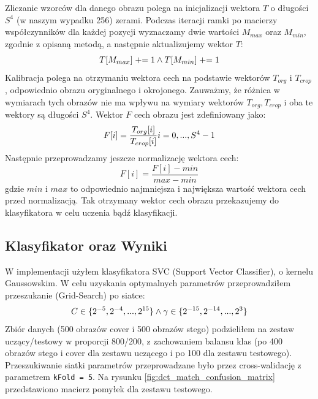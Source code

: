 Zliczanie wzorców dla danego obrazu polega na inicjalizacji wektora $T$ o długości $S^4$ (w naszym wypadku 256) zerami. Podczas iteracji ramki po macierzy współczynników dla każdej pozycji wyznaczamy dwie wartości $M_{max}$ oraz $M_{min}$, zgodnie z opisaną metodą, a następnie aktualizujemy wektor $T$:
\begin{equation}
	T[M_{max}] \mathrel{+}= 1 \space \land \space
	T[M_{min}] \mathrel{+}= 1
\end{equation}
Kalibracja polega na otrzymaniu wektora cech na podstawie wektorów $T_{org}$ i $T_{crop}$, odpowiednio obrazu oryginalnego i okrojonego. Zauważmy, że różnica w wymiarach tych obrazów nie ma wpływu na wymiary wektorów $T_{org}, T_{crop}$ i oba te wektory są długości $S^4$. Wektor $F$ cech obrazu jest zdefiniowany jako:
\begin{equation}
	F[i] = \frac{T_{org}[i]}{T_{crop}[i]} \space \space i=0,...,S^4-1
\end{equation}
Następnie przeprowadzamy jeszcze normalizację wektora cech:
\begin{equation}
	F[i] = \frac{F[i] - min}{max - min}
\end{equation}
gdzie $min$ i $max$ to odpowiednio najmniejsza i największa wartość wektora cech przed normalizacją. Tak otrzymany wektor cech obrazu przekazujemy do klasyfikatora w celu uczenia bądź klasyfikacji.

\subsection{Klasyfikator oraz Wyniki}
W implementacji użyłem klasyfikatora SVC (Support Vector Classifier), o kernelu Gaussowskim. W celu uzyskania optymalnych parametrów przeprowadziłem przeszukanie (Grid-Search) po siatce:
\begin{equation}
	C \in \{ 2^{-5}, 2^{-4}, ..., 2^{15}\} \space \land \space
	\gamma \in \{ 2^{-15}, 2^{-14}, ..., 2^3\}
\end{equation}
Zbiór danych (500 obrazów cover i 500 obrazów stego) podzieliłem na zestaw uczący/testowy w proporcji 800/200, z zachowaniem balansu klas (po 400 obrazów stego i cover dla zestawu uczącego i po 100 dla zestawu testowego). Przeszukiwanie siatki parametrów przeprowadzane było przez cross-walidację z parametrem \verb|kFold = 5|. Na rysunku \ref{fig:dct_match_confusion_matrix} przedstawiono macierz pomyłek dla zestawu testowego.

